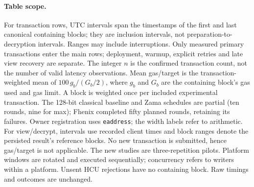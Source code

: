 \paragraph{Table scope.}
For transaction rows, UTC intervals span the timestamps of the first and last canonical containing blocks; they are inclusion intervals, not preparation-to-decryption intervals. Ranges may include interruptions.
Only measured primary transactions enter the main rows; deployment, warmup, explicit retries and late view recovery are separate. The integer $n$ is the confirmed transaction count, not the number of valid latency observations.
Mean gas/target is the transaction-weighted mean of $100\,g_b/(G_b/2)$, where $g_b$ and $G_b$ are the containing block's gas used and gas limit. A block is weighted once per included experimental transaction.
The 128-bit classical baseline and Zama schedules are partial (ten rounds, nine for max); Fhenix completed fifty planned rounds, retaining its failures. Owner registration uses \texttt{eaddress}; the width labels refer to arithmetic.
For view/decrypt, intervals use recorded client times and block ranges denote the persisted result's reference blocks. No new transaction is submitted, hence gas/target is not applicable.
The new studies are three-repetition pilots. Platform windows are rotated and executed sequentially; concurrency refers to writers within a platform. Unsent HCU rejections have no containing block. Raw timings and outcomes are unchanged.
